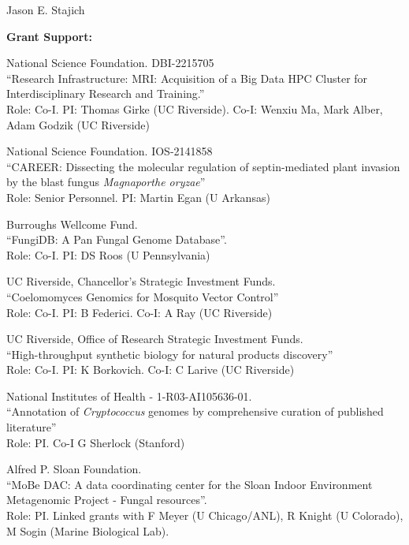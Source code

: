 \documentclass[10pt]{article}
\begin{document}
\begin{cv}{\centerline{Jason E. Stajich}}
\begin{cvlistcompact}{\bf Grant Support:}
\item [2022-2026] National Science Foundation. DBI-2215705 \\
``Research Infrastructure: MRI: Acquisition of a Big Data HPC Cluster for Interdisciplinary Research and Training.'' \\
Role: Co-I. PI: Thomas Girke (UC Riverside). Co-I: Wenxiu Ma, Mark Alber, Adam Godzik (UC Riverside)

\item [2022-2027] National Science Foundation. IOS-2141858 \\
``CAREER: Dissecting the molecular regulation of septin-mediated plant invasion by the blast fungus \textit{Magnaporthe oryzae}'' \\
Role: Senior Personnel. PI: Martin Egan (U Arkansas)

\item [{\bf Completed support}]

\item [2010-2013] Burroughs Wellcome Fund. \\
 ``FungiDB: A Pan Fungal Genome Database''. \\
Role: Co-I. PI: DS Roos (U Pennsylvania)

\item [2011-2012] UC Riverside, Chancellor's Strategic Investment
  Funds. \\
``Coelomomyces Genomics for Mosquito Vector Control'' \\
Role: Co-I. PI: B Federici. Co-I: A Ray (UC Riverside)

\item [2013-2014] UC Riverside, Office of Research Strategic Investment
  Funds. \\
``High-throughput synthetic biology for natural products discovery'' \\
Role: Co-I. PI: K Borkovich. Co-I: C Larive (UC Riverside)

\item [2013-2014] National Institutes of Health - 1-R03-AI105636-01. \\
``Annotation of \textit{Cryptococcus} genomes by comprehensive
  curation of published literature'' \\
Role: PI. Co-I G Sherlock (Stanford)

  \item [2011-2014] Alfred P. Sloan Foundation. \\
``MoBe DAC: A data coordinating center for the Sloan Indoor
Environment Metagenomic Project - Fungal resources''. \\
Role: PI.  Linked grants with F Meyer (U Chicago/ANL), R Knight (U Colorado), M Sogin (Marine Biological Lab).


\end{cvlistcompact}
\end{cv}
\end{document}
